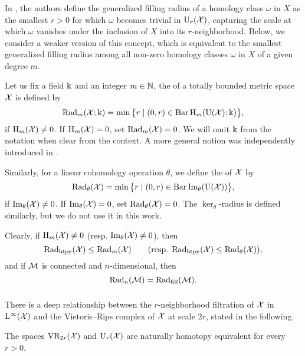 \subsubsection{} \label{ss:beta v.s. fillrad}

In \cite[Defn.~9.44]{lim2024vietoris}, the authors define the generalized filling radius of a homology class \(\omega\) in \(X\) as the smallest \(r > 0\) for which \(\omega\) becomes trivial in \(\mathrm{U}_r(\mathcal{X})\), capturing the scale at which \(\omega\) vanishes under the inclusion of \(X\) into its \(r\)-neighborhood.
Below, we consider a weaker version of this concept, which is equivalent to the smallest generalized filling radius among all non-zero homology classes \(\omega\) in \(X\) of a given degree $m$.

Let us fix a field \(\Bbbk\) and an integer \(m \in \mathbb{N}\), the  of a totally bounded metric space \(\mathcal{X}\) is defined by
\[
\mathrm{Rad}_{m}(\mathcal{X}; \Bbbk) =
\min \big\{r \mid (0, r) \in \operatorname{Bar} \mathrm{H}_m(\mathrm{U}(\mathcal{X}); \Bbbk)\big\},
\]
if \(\mathrm{H}_m(\mathcal{X}) \neq 0\).
If \(\mathrm{H}_m(\mathcal{X}) = 0\), set \(\mathrm{Rad}_{m}(\mathcal{X}) = 0\).
We will omit \(\Bbbk\) from the notation when clear from the context.
A more general notion was independently introduced in \cite[Defn.~9.44]{lim2024vietoris}.

Similarly, for a linear cohomology operation \(\theta\), we define the  of \(\mathcal{X}\) by
\[
\mathrm{Rad}_{\theta}(\mathcal{X}) = \min \big\{r \mid (0, r) \in \operatorname{Bar} \operatorname{Im}_\theta(\mathrm{U}(\mathcal{X}))\big\},
\]
if \(\operatorname{Im}_\theta(\mathcal{X}) \neq 0\).
If \(\operatorname{Im}_\theta(\mathcal{X}) = 0\), set $\mathrm{Rad}_{\theta}(\mathcal{X}) = 0$.
The \(\ker_\theta\)-radius is defined similarly, but we do not use it in this work.

Clearly, if \(\mathrm{H}_m(\mathcal{X}) \neq 0\) (resp. \(\operatorname{Im}_\theta(\mathcal{X}) \neq 0\)), then
\[
\mathrm{Rad}_{\mathrm{htpy}}(\mathcal{X}) \leq \mathrm{Rad}_{m}(\mathcal{X}) \qquad (\text{resp. }\mathrm{Rad}_{\mathrm{htpy}}(\mathcal{X}) \leq \mathrm{Rad}_{\theta}(\mathcal{X})),
\]
and if $\mathcal{M}$ is connected and $n$-dimensional, then
\[
\mathrm{Rad}_{n}(\mathcal{M}) = \mathrm{Rad}_{\mathrm{fill}}(\mathcal{M}).
\]


\subsubsection{}\label{ss:kuratowski_vr}

There is a deep relationship between the \(r\)-neighborhood filtration of $\mathcal{X}$ in $\mathrm{L}^\infty(\mathcal{X})$ and the Vietoris--Rips complex of \(\mathcal{X}\) at scale \(2r\), stated in the following.

\proposition \cite[Thm.~4.1]{lim2024vietoris} The spaces $\mathrm{VR}_{2r}(\mathcal{X})$ and $\mathrm{U}_r(\mathcal{X})$ are naturally homotopy equivalent for every \(r > 0\).

